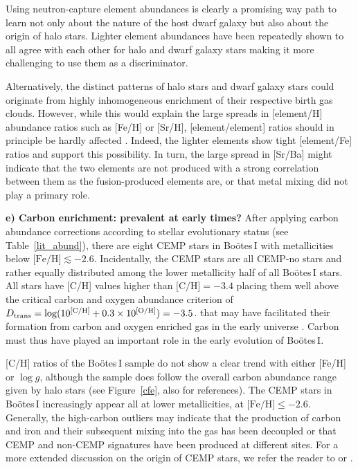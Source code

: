 \documentclass[]{emulateapj}
\begin{document}
Using neutron-capture element abundances is clearly a promising way
path to learn not only about the nature of the host dwarf galaxy but
also about the origin of halo stars. Lighter element abundances have
been repeatedly shown to all agree with each other for halo and dwarf
galaxy stars making it more challenging to use them as a
discriminator. 


Alternatively, the distinct patterns of halo stars and dwarf galaxy
stars could originate from highly inhomogeneous enrichment of their
respective birth gas clouds. However, while this would explain the
large spreads in [element/H] abundance ratios such as [Fe/H] or
[Sr/H], [element/element] ratios should in principle be hardly
affected \citep{frebel12}. Indeed, the lighter elements show tight
[element/Fe] ratios and support this possibility. In turn, the large
spread in [Sr/Ba] might indicate that the two elements are not
produced with a strong correlation between them as the
fusion-produced elements are, or that metal mixing did not play a
primary role. 

\textbf{e) Carbon enrichment: prevalent at early
  times?}\label{sec:carbon} After applying carbon abundance
corrections according to stellar evolutionary status (see
Table~\ref{lit_abund}), there are eight CEMP stars in Bo\"otes\,I with
metallicities below $\mbox{[Fe/H]}\lesssim-2.6$. Incidentally, the
CEMP stars are all CEMP-no stars and rather equally distributed among
the lower metallicity half of all Bo\"otes\,I stars. All stars have
[C/H] values higher than $\mbox{[C/H]}=-3.4$ placing them well above
the critical carbon and oxygen abundance criterion of $D_{\rm{trans}}
= \log(10^{\rm{[C/H]}} +0.3\times10^{\rm{[O/H]}})=-3.5$.  that may
have facilitated their formation from carbon and oxygen enriched gas
in the early universe \citep{dtrans}. Carbon must thus have played an
important role in the early evolution of Bo\"otes\,I.

[C/H] ratios of the Bo\"otes\,I sample do not show a clear trend with
either [Fe/H] or $\log g$, although the sample does follow the overall
carbon abundance range given by halo stars (see Figure~\ref{cfe}, also
for references). The CEMP stars in Bo\"otes\,I increasingly appear all
at lower metallicities, at $\mbox{[Fe/H]}\le-2.6$. Generally, the
high-carbon outliers may indicate that the production of carbon and
iron and their subsequent mixing into the gas has been decoupled or
that CEMP and non-CEMP signatures have been produced at different
sites. For a more extended discussion on the origin of CEMP stars, we
refer the reader to \citet{norris13_IV} or \citet{fn15}.
\end{document}
